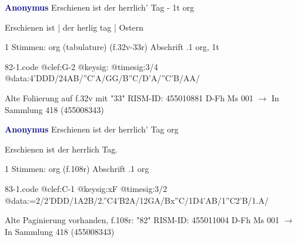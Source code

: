 \documentclass[twocolumn]{book}
\begin{document}
\newline \par \vspace{7pt} \textcolor{darkblue}{\textbf{Anonymus  }}
\newline Erschienen ist der herrlich' Tag - 1t
\newline org
\newline \begin{itshape}[f.32v, at left:] Erschienen ist | der herlig tag | Ostern\end{itshape} 
\newline \textcolor{darkblue}{}  1 Stimmen: org (tabulature)  (f.32v-33r)
\newline Abschrift
.1  org, 1t  
\begin{filecontents*}{82-1.code}
@clef:G-2
@keysig:
@timesig:3/4
@data:4'DDD/24AB/''C'A/GG/B''C/D'A/''C'B/AA/
\end{filecontents*}
\newline
%
\newline Alte Foliierung auf f.32v mit "33"
\newline RISM-ID: 455010881
\newline D-Fh  Ms 001
\newline $\rightarrow$ In Sammlung 418 (455008343)
      
\newline \par \vspace{7pt} \textcolor{darkblue}{\textbf{Anonymus  }}
\newline Erschienen ist der herrlich' Tag
\newline org
\newline \begin{itshape}[f.108r, heading:] Erschienen ist der herrlich Tag.\end{itshape} 
\newline \textcolor{darkblue}{}  1 Stimmen: org  (f.108r)
\newline Abschrift
.1  org  
\begin{filecontents*}{83-1.code}
@clef:C-1
@keysig:xF
@timesig:3/2
@data:=2/2'DDD/1A2B/2.''C4'B2A/12GA/Bx''C/1D4'AB/1''C2'B/1.A/
\end{filecontents*}
\newline
%
\newline Alte Paginierung vorhanden, f.108r: "82"
\newline RISM-ID: 455011004
\newline D-Fh  Ms 001
\newline $\rightarrow$ In Sammlung 418 (455008343)
      
\end{document}
